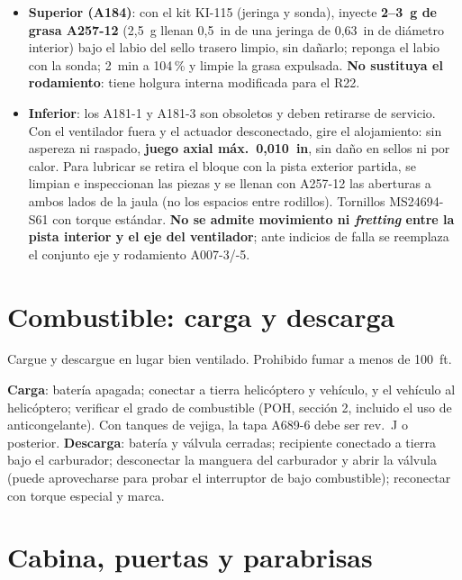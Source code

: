 \begin{itemize}
\item \textbf{Superior (A184)}: con el kit KI-115 (jeringa y sonda), inyecte \textbf{2--3~g de grasa A257-12} (2,5~g llenan 0,5~in de una jeringa de 0,63~in de diámetro interior) bajo el labio del sello trasero limpio, sin dañarlo; reponga el labio con la sonda; 2~min a 104\,\% y limpie la grasa expulsada. \textbf{No sustituya el rodamiento}: tiene holgura interna modificada para el R22.
\item \textbf{Inferior}: los A181-1 y A181-3 son obsoletos y deben retirarse de servicio. Con el ventilador fuera y el actuador desconectado, gire el alojamiento: sin aspereza ni raspado, \textbf{juego axial máx.\ 0,010~in}, sin daño en sellos ni por calor. Para lubricar se retira el bloque con la pista exterior partida, se limpian e inspeccionan las piezas y se llenan con A257-12 las aberturas a ambos lados de la jaula (no los espacios entre rodillos). Tornillos MS24694-S61 con torque estándar. \textbf{No se admite movimiento ni \emph{fretting} entre la pista interior y el eje del ventilador}; ante indicios de falla se reemplaza el conjunto eje y rodamiento A007-3/-5.
\end{itemize}

\section{Combustible: carga y descarga}

\begin{advertencia}
Cargue y descargue en lugar bien ventilado. Prohibido fumar a menos de 100~ft.
\end{advertencia}

\textbf{Carga}: batería apagada; conectar a tierra helicóptero y vehículo, y el vehículo al helicóptero; verificar el grado de combustible (POH, sección 2, incluido el uso de anticongelante). Con tanques de vejiga, la tapa A689-6 debe ser rev.~J o posterior. \textbf{Descarga}: batería y válvula cerradas; recipiente conectado a tierra bajo el carburador; desconectar la manguera del carburador y abrir la válvula (puede aprovecharse para probar el interruptor de bajo combustible); reconectar con torque especial y marca.

\section{Cabina, puertas y parabrisas}

